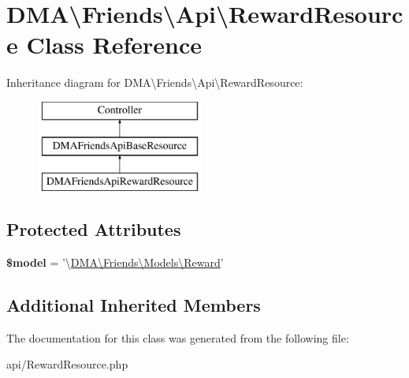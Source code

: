 \hypertarget{classDMA_1_1Friends_1_1Api_1_1RewardResource}{\section{D\+M\+A\textbackslash{}Friends\textbackslash{}Api\textbackslash{}Reward\+Resource Class Reference}
\label{classDMA_1_1Friends_1_1Api_1_1RewardResource}
}
Inheritance diagram for D\+M\+A\textbackslash{}Friends\textbackslash{}Api\textbackslash{}Reward\+Resource\+:\begin{figure}[H]
\begin{center}
\leavevmode
\includegraphics[height=3.000000cm]{d2/d30/classDMA_1_1Friends_1_1Api_1_1RewardResource}
\end{center}
\end{figure}
\subsection*{Protected Attributes}
\begin{DoxyCompactItemize}
\item 
\hypertarget{classDMA_1_1Friends_1_1Api_1_1RewardResource_a60661c07e9263496284122d8cd568f91}{{\bfseries \$model} = '\textbackslash{}\hyperlink{classDMA_1_1Friends_1_1Models_1_1Reward}{D\+M\+A\textbackslash{}\+Friends\textbackslash{}\+Models\textbackslash{}\+Reward}'}\label{classDMA_1_1Friends_1_1Api_1_1RewardResource_a60661c07e9263496284122d8cd568f91}

\end{DoxyCompactItemize}
\subsection*{Additional Inherited Members}


The documentation for this class was generated from the following file\+:\begin{DoxyCompactItemize}
\item 
api/Reward\+Resource.\+php\end{DoxyCompactItemize}

